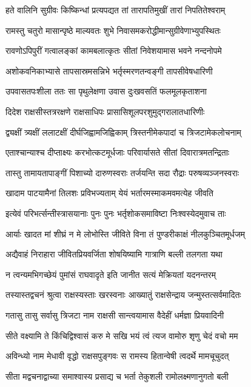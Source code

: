 \twolineshloka
{हते वालिनि सुग्रीवः किष्किन्धां प्रत्यपद्यत}
{तां तारापतिमुखीं तारां निपतितेश्वराम्}


\twolineshloka
{रामस्तु चतुरो मासान्पृष्ठे माल्यवतः शुभे}
{निवासमकरोद्धीमान्सुग्रीवेणाभ्युपस्थितः}


\twolineshloka
{रावणोऽपिपुरीं गत्वालङ्कां कामबलात्कृतः}
{सीतां निवेशयामास भवने नन्दनोपमे}


\twolineshloka
{अशोकवनिकाभ्यासे तापसास्रमसन्निभे}
{भर्तृस्मरणतन्वङ्गी तापसीवेषधारिणी}


\twolineshloka
{उपवासतपःशीला ततः सा पृथुलेक्षणा}
{उवास दुःखवसतिं फलमूलकृताशना}


\twolineshloka
{दिदेश राक्षसीस्तत्ररक्षणे राक्षसाधिपः}
{प्रासासिशूलपरशुमुद्गरालातधारिणीः}


\twolineshloka
{द्व्यक्षीं त्र्यक्षीं ललाटक्षीं दीर्घजिह्वामजिह्विकाम्}
{त्रिस्तनीमेकपादां च त्रिजटामेकलोचनाम्}


\twolineshloka
{एताश्चान्याश्च दीप्ताक्ष्यः करभोत्कटमूर्धजाः}
{परिवार्यासते सीतां दिवारात्रमतन्द्रिताः}


\twolineshloka
{तास्तु तामायतापाङ्गीं पिशाच्यो दारुणस्वराः}
{तर्जयन्ति सदा रौद्राः परुषव्यञ्जनस्वराः}


\twolineshloka
{खादाम पाटयामैनां तिलशः प्रविभज्यताम्}
{येयं भर्तारमस्माकमवमत्येह जीवति}


\twolineshloka
{इत्येवं परिभर्त्सन्तीस्त्रासयानाः पुनः पुनः}
{भर्तृशोकसमाविष्टा निःश्वस्येदमुवाच ताः}


\twolineshloka
{आर्याः खादत मां शीघ्रं न मे लोभोस्ति जीविते}
{विना तं पुण्डरीकाक्षं नीलकुञ्चितमूर्धजम्}


\twolineshloka
{अद्यैवाहं निराहारा जीवितप्रियवर्जिता}
{शोषयिष्यामि गात्राणि बल्ली तलगता यथा}


\twolineshloka
{न त्वन्यमभिगच्छेयं पुमांसं राघवादृते}
{इति जानीत सत्यं मेक्रियतां यदनन्तरम्}


\twolineshloka
{तस्यास्तद्वचनं श्रुत्वा राक्षस्यस्ताः खरस्वनाः}
{आख्यातुं राक्षसेन्द्राय जन्मुस्तत्सर्वमादितः}


\twolineshloka
{गतासु तासु सर्वासु त्रिजटा नाम राक्षसी}
{सान्त्वयामास वैदेहीं धर्मज्ञा प्रियवादिनी}


\twolineshloka
{सीते वक्ष्यामि ते किंचिद्विश्वासं करु मे सखि}
{भयं त्वं त्यज वामोरु शृणु चेदं वचो मम}


\twolineshloka
{अविन्ध्यो नाम मेधावी वृद्धो राक्षसपुङ्गवः}
{स रामस्य हितान्वेषी त्वदर्थे मामचूचुदत्}


\twolineshloka
{सीता मद्वचनाद्वाच्या समाश्वास्य प्रसाद्य च}
{भर्ता तेकुशली रामोलक्ष्मणानुगतो बली}



